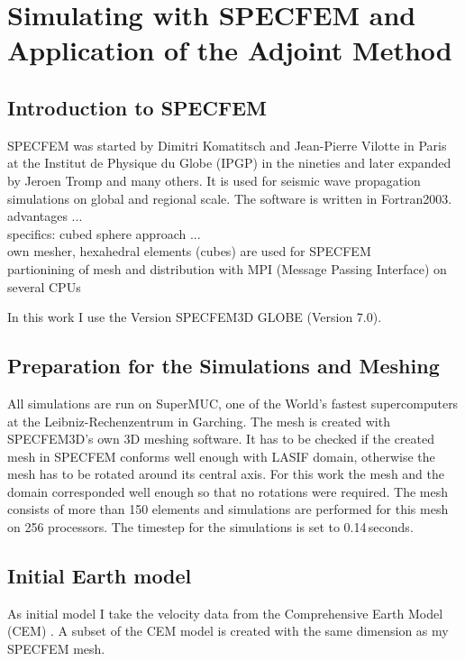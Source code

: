 \section{Simulating with SPECFEM and Application of the Adjoint Method}

\subsection{Introduction to SPECFEM}

SPECFEM \cite{Vilotte1998} was started by Dimitri Komatitsch and Jean-Pierre Vilotte in Paris at the Institut de Physique du Globe (IPGP) in the nineties 
and later expanded by Jeroen Tromp and many others. 
It is used for seismic wave propagation simulations on global and regional scale. 
The software is written in Fortran2003. \\
advantages ... \\
specifics: cubed sphere approach ... \\
own mesher, hexahedral elements (cubes) are used for SPECFEM \\
partionining of mesh and distribution with MPI (Message Passing Interface) on several CPUs 

In this work I use the Version SPECFEM3D GLOBE (Version 7.0). 


\subsection{Preparation for the Simulations and Meshing}

All simulations are run on SuperMUC, one of the World's fastest supercomputers at the Leibniz-Rechenzentrum in Garching. 
The mesh is created with SPECFEM3D's own 3D meshing software. 
It has to be checked if the created mesh in SPECFEM conforms well enough with LASIF domain, otherwise the mesh has to 
be rotated around its central axis.
For this work the mesh and the domain corresponded well enough so that no rotations were required.
The mesh consists of more than 150 %
elements and simulations are performed for this mesh on 256 processors.
The timestep for the simulations is set to 0.14$\,$seconds.  


\subsection{Initial Earth model}

As initial model I take the velocity data from the Comprehensive Earth Model (CEM) \citep{Afanasiev2014}.
A subset of the CEM model is created with the same dimension as my SPECFEM mesh. 


